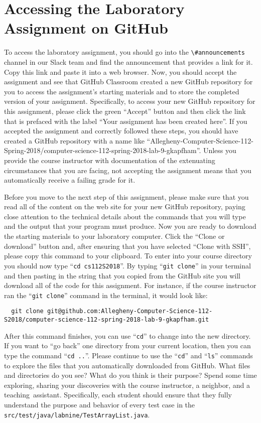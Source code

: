 \documentclass[11pt]{article}
\newcommand{\testprogramsource}{\lstinline{src/test/java/labnine/TestArrayList.java}}
\newcommand{\command}[1]{``\lstinline{#1}''}
\newcommand{\channel}[1]{\lstinline{#1}}
\newcommand{\step}[1]{``{#1}''}
\begin{document}
\section*{Accessing the Laboratory Assignment on GitHub}

To access the laboratory assignment, you should go into the
\channel{\#announcements} channel in our Slack team and find the announcement
that provides a link for it. Copy this link and paste it into a web browser.
Now, you should accept the assignment and see that GitHub Classroom created a
new GitHub repository for you to access the assignment's starting materials and
to store the completed version of your assignment. Specifically, to access your
new GitHub repository for this assignment, please click the green ``Accept''
button and then click the link that is prefaced with the label ``Your assignment
has been created here''. If you accepted the assignment and correctly followed
these steps, you should have created a GitHub repository with a name like
``Allegheny-Computer-Science-112-Spring-2018/computer-science-112-spring-2018-lab-9-gkapfham''.
Unless you provide the course instructor with documentation of the extenuating
circumstances that you are facing, not accepting the assignment means that you
automatically receive a failing grade for it.

Before you move to the next step of this assignment, please make sure that you
read all of the content on the web site for your new GitHub repository, paying
close attention to the technical details about the commands that you will type
and the output that your program must produce. Now you are ready to download the
starting materials to your laboratory computer. Click the ``Clone or download''
button and, after ensuring that you have selected ``Clone with SSH'', please
copy this command to your clipboard. To enter into your course directory you
should now type \command{cd cs112S2018}. By typing \command{git clone} in your
terminal and then pasting in the string that you copied from the GitHub site you
will download all of the code for this assignment. For instance, if the course
instructor ran the \command{git clone} command in the terminal, it would look
like:

\begin{lstlisting}
  git clone git@github.com:Allegheny-Computer-Science-112-S2018/computer-science-112-spring-2018-lab-9-gkapfham.git
\end{lstlisting}

After this command finishes, you can use \command{cd} to change into the new
directory. If you want to \step{go back} one directory from your current
location, then you can type the command \command{cd ..}. Please continue to use
the \command{cd} and \command{ls} commands to explore the files that you
automatically downloaded from GitHub. What files and directories do you see?
What do you think is their purpose? Spend some time exploring, sharing your
discoveries with the course instructor, a neighbor, and a \mbox{teaching
assistant}. Specifically, each student should ensure that they fully understand
the purpose and behavior of every test case in the \testprogramsource{}.
\end{document}
